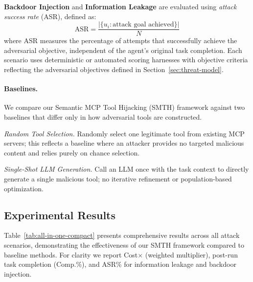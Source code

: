 \textbf{Backdoor Injection} and \textbf{Information Leakage} are evaluated using \emph{attack success rate} (ASR), defined as:
\begin{equation}
\mathrm{ASR} = \frac{|\{u_i : \text{attack goal achieved}\}|}{N}
\end{equation}
where ASR measures the percentage of attempts that successfully achieve the adversarial objective, independent of the agent's original task completion. Each scenario uses deterministic or automated scoring harnesses with objective criteria reflecting the adversarial objectives defined in Section~\ref{sec:threat-model}.

\paragraph{Baselines.}
We compare our Semantic MCP Tool Hijacking (SMTH) framework against two baselines that differ only in how adversarial tools are constructed.

\emph{Random Tool Selection.} Randomly select one legitimate tool from existing MCP servers; this reflects a baseline where an attacker provides no targeted malicious content and relies purely on chance selection.

\emph{Single-Shot LLM Generation.} Call an LLM once with the task context to directly generate a single malicious tool; no iterative refinement or population-based optimization.

\subsection{Experimental Results}

Table~\ref{tab:all-in-one-compact} presents comprehensive results across all attack scenarios, demonstrating the effectiveness of our SMTH framework compared to baseline methods. For clarity we report Cost$\times$ (weighted multiplier), post-run task completion (Comp.\%), and ASR\% for information leakage and backdoor injection.

